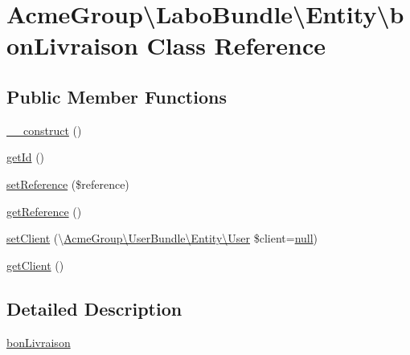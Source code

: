 \hypertarget{class_acme_group_1_1_labo_bundle_1_1_entity_1_1bon_livraison}{\section{Acme\+Group\textbackslash{}Labo\+Bundle\textbackslash{}Entity\textbackslash{}bon\+Livraison Class Reference}
\label{class_acme_group_1_1_labo_bundle_1_1_entity_1_1bon_livraison}
}
\subsection*{Public Member Functions}
\begin{DoxyCompactItemize}
\item 
\hyperlink{class_acme_group_1_1_labo_bundle_1_1_entity_1_1bon_livraison_a0b90f85c9582078101db270231dcb42f}{\+\_\+\+\_\+construct} ()
\item 
\hyperlink{class_acme_group_1_1_labo_bundle_1_1_entity_1_1bon_livraison_ab64a881c8d5768d35783bf87a65429af}{get\+Id} ()
\item 
\hyperlink{class_acme_group_1_1_labo_bundle_1_1_entity_1_1bon_livraison_a34838c5819cccd326e7f5a2107e05d86}{set\+Reference} (\$reference)
\item 
\hyperlink{class_acme_group_1_1_labo_bundle_1_1_entity_1_1bon_livraison_abb98d83d9e4aece3fd049dacbf39c397}{get\+Reference} ()
\item 
\hyperlink{class_acme_group_1_1_labo_bundle_1_1_entity_1_1bon_livraison_a0716e3b825aabc2030dd3a12b31fd6c3}{set\+Client} (\textbackslash{}\hyperlink{class_acme_group_1_1_user_bundle_1_1_entity_1_1_user}{Acme\+Group\textbackslash{}\+User\+Bundle\textbackslash{}\+Entity\textbackslash{}\+User} \$client=\hyperlink{validate_8js_afb8e110345c45e74478894341ab6b28e}{null})
\item 
\hyperlink{class_acme_group_1_1_labo_bundle_1_1_entity_1_1bon_livraison_a82f826c4a2fc1ecff9851458dd4f2652}{get\+Client} ()
\end{DoxyCompactItemize}


\subsection{Detailed Description}
\hyperlink{class_acme_group_1_1_labo_bundle_1_1_entity_1_1bon_livraison}{bon\+Livraison}

